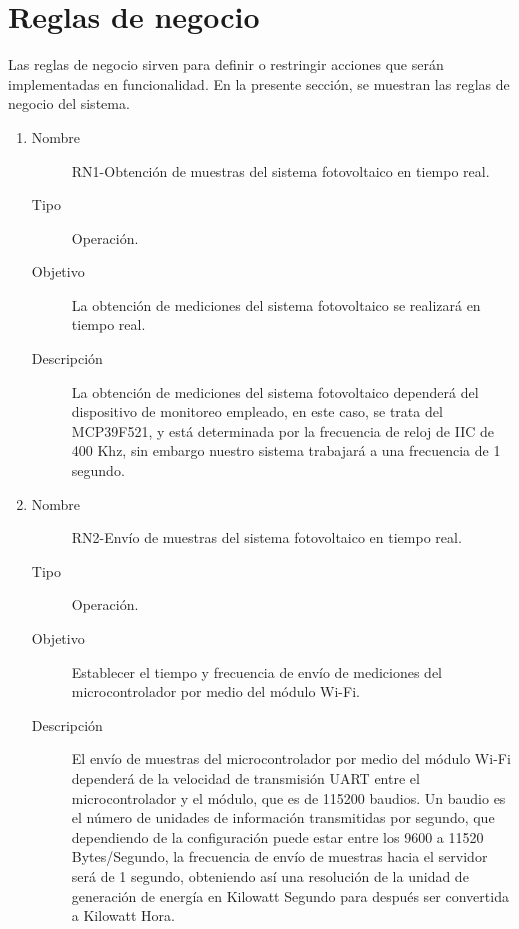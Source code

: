 \section{Reglas de negocio}
Las reglas de negocio sirven para definir o restringir acciones que serán implementadas en funcionalidad. 
En la presente sección, se muestran las reglas de negocio del sistema.
\begin{enumerate}[label=RN\arabic*.]
    \item \label{RN1}
		\begin{description}
			\item[Nombre] RN1-Obtención de muestras del sistema fotovoltaico en tiempo real.
			\item[Tipo] Operación.
			\item[Objetivo] La obtención de mediciones del sistema fotovoltaico se realizará en tiempo real.
			\item[Descripción] La obtención de mediciones del sistema fotovoltaico dependerá del dispositivo de monitoreo empleado, en este caso, se trata del MCP39F521, y está determinada por la frecuencia de reloj de IIC de 400 Khz, sin embargo nuestro sistema trabajará a una frecuencia de 1 segundo.
    		\end{description}
    		
\item \label{RN2}
	\begin{description}
		\item[Nombre] RN2-Envío de muestras del sistema fotovoltaico en tiempo real.
		\item[Tipo] Operación.
		\item[Objetivo] Establecer el tiempo y frecuencia de envío de mediciones del microcontrolador por medio del módulo Wi-Fi.
		\item[Descripción] El envío de muestras del microcontrolador por medio del módulo Wi-Fi dependerá de la velocidad de transmisión UART entre el microcontrolador y el módulo, que es de 115200 baudios. Un baudio es el número de unidades de información transmitidas por segundo, que dependiendo de la configuración puede estar entre los 9600 a 11520 Bytes/Segundo, la frecuencia de envío de muestras hacia el servidor será de 1 segundo, obteniendo así una resolución de la unidad de generación de energía en Kilowatt Segundo para después ser convertida a Kilowatt Hora.
		\end{description}	
		

\end{enumerate}
